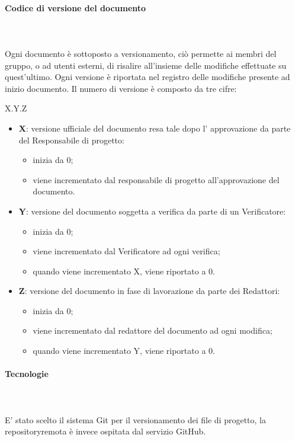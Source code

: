 	\paragraph{Codice di versione del documento} \mbox{}\\ \mbox{}\\
	Ogni documento è sottoposto a versionamento, ciò permette ai membri del gruppo, o ad utenti esterni, di risalire all'insieme delle modifiche effettuate su quest'ultimo. Ogni versione è riportata nel registro delle modifiche presente ad inizio documento.
	Il numero di versione è composto da tre cifre:
	\begin{center}
		X.Y.Z
	\end{center}
	\begin{itemize}
		\item \textbf{X}: versione ufficiale del documento resa tale dopo l' approvazione da parte del Responsabile di progetto:
		\begin{itemize}
			\item inizia da 0;
			\item viene incrementato dal responsabile di progetto all'approvazione del documento.
		\end{itemize}
		\item \textbf{Y}: versione del documento soggetta a verifica da parte di un Verificatore:
		\begin{itemize}
			\item inizia da 0;
			\item viene incrementato dal Verificatore ad ogni verifica;
			\item quando viene incrementato X, viene riportato a 0.
		\end{itemize}
		\item \textbf{Z}: versione del documento in fase di lavorazione da parte dei Redattori:
		\begin{itemize}
			\item inizia da 0;
			\item viene incrementato dal redattore del documento ad ogni modifica;
			\item quando viene incrementato Y, viene riportato a 0.
		\end{itemize}			
	\end{itemize}
	\paragraph{Tecnologie} \mbox{}\\ \mbox{}\\
	E' stato scelto il sistema Git per il versionamento dei file di progetto, la repository\glosp remota è invece ospitata dal servizio GitHub\glo. 
